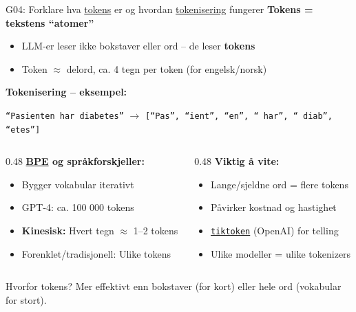 \documentclass[aspectratio=169, 10pt]{beamer}
\begin{document}
\begin{frame}{G04: Forklare hva \href{https://en.wikipedia.org/wiki/Lexical_analysis\#Token}{tokens} er og hvordan \href{https://en.wikipedia.org/wiki/Tokenization_(lexical_analysis)}{tokenisering} fungerer}
    \textbf{Tokens = tekstens ``atomer''}
    \begin{itemize}
        \item LLM-er leser ikke bokstaver eller ord -- de leser \textbf{tokens}
        \item Token $\approx$ delord, ca. 4 tegn per token (for engelsk/norsk)
    \end{itemize}

    \vspace{0.15cm}
    \textbf{Tokenisering -- eksempel:}
    \begin{center}
        \footnotesize
        \texttt{``Pasienten har diabetes''} $\rightarrow$ \texttt{[``Pas'', ``ient'', ``en'', `` har'', `` diab'', ``etes'']}
    \end{center}

    \vspace{0.1cm}
    \begin{columns}[T]
        \begin{column}{0.48\textwidth}
            \textbf{\href{https://en.wikipedia.org/wiki/Byte_pair_encoding}{BPE} og språkforskjeller:}
            \footnotesize
            \begin{itemize}
                \item Bygger vokabular iterativt
                \item GPT-4: ca. 100 000 tokens
                \item \textbf{Kinesisk:} Hvert tegn $\approx$ 1--2 tokens
                \item Forenklet/tradisjonell: Ulike tokens
            \end{itemize}
        \end{column}
        \begin{column}{0.48\textwidth}
            \textbf{Viktig å vite:}
            \footnotesize
            \begin{itemize}
                \item Lange/sjeldne ord = flere tokens
                \item Påvirker kostnad og hastighet
                \item \href{https://github.com/openai/tiktoken}{\texttt{tiktoken}} (OpenAI) for telling
                \item Ulike modeller = ulike tokenizers
            \end{itemize}
        \end{column}
    \end{columns}

    \begin{block}{\footnotesize Hvorfor tokens?}
        \footnotesize Mer effektivt enn bokstaver (for kort) eller hele ord (vokabular for stort).
    \end{block}
\end{frame}
\end{document}
